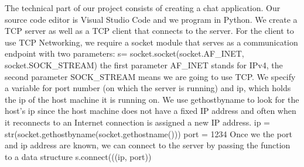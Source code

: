 The technical part of our project consists of creating a chat application. Our source code editor is Visual Studio Code and we program in Python. We create a TCP server as well as a TCP client that connects to the server. 
For the client to use TCP Networking, we require a socket module that serves as a communication endpoint with two parameters:
s= socket.socket(socket.AF_INET, socket.SOCK_STREAM)
the first parameter AF_INET stands for IPv4, the second parameter SOCK_STREAM means we are going to use TCP. We specify a variable for port number (on which the server is running) and ip, which holds the ip of the host machine it is running on. We use gethostbyname to look for the host’s ip since the host machine does not have a fixed IP address and often when it reconnects to an Internet connection is assigned a new IP address.
ip = str(socket.gethostbyname(socket.gethostname()))
port = 1234
Once we the port and ip address are known, we can connect to the server by passing the function to a data structure s.connect(((ip, port))

